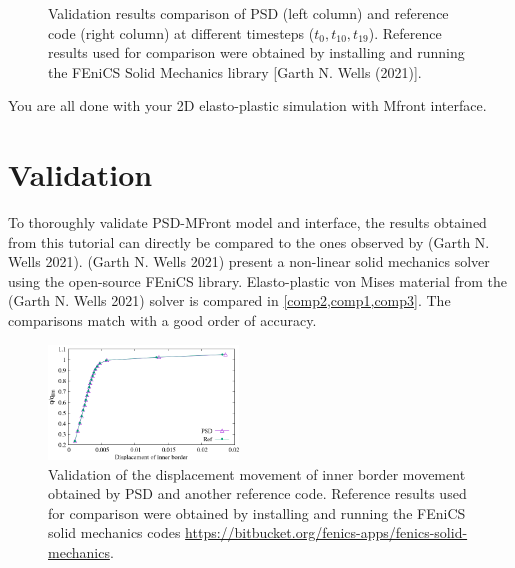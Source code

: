\begin{figure}[h!]
\caption{Validation results comparison of PSD (left column) and reference code (right column) at different timesteps ($t_0, t_{10}, t_{19}$). Reference results used for comparison  were obtained by installing and running the FEniCS Solid Mechanics library [Garth N. Wells (2021)]. \label{comp2}}
\end{figure}

You are all done with your 2D elasto-plastic simulation with Mfront
interface.

\section{Validation}

To thoroughly validate PSD-MFront model and interface, the results
obtained from this tutorial can directly be compared to the ones
observed by (Garth N. Wells 2021). (Garth N. Wells 2021) present a
non-linear solid mechanics solver using the open-source FEniCS library.
Elasto-plastic von Mises material from the (Garth N. Wells 2021) solver
is compared in \cref{comp2,comp1,comp3}. The comparisons match with a
good order of accuracy.

\begin{figure}[h!] 
\centering
\includegraphics[width=0.45\textwidth]{./Images/final.png}
\caption{Validation of the displacement  movement of inner border movement obtained by PSD and another reference code.  Reference results used for comparison  were obtained by installing and running the FEniCS solid mechanics codes \url{https://bitbucket.org/fenics-apps/fenics-solid-mechanics}. \label{comp3}}
\end{figure}

